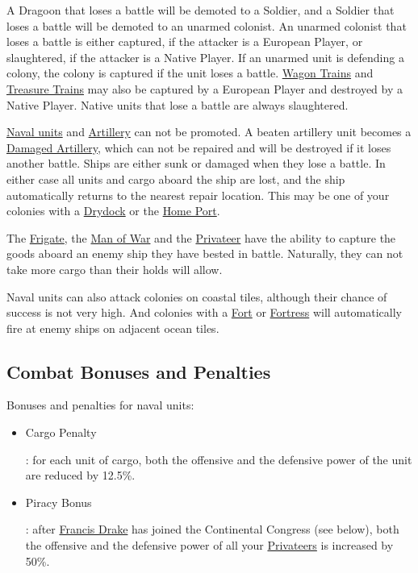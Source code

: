 \documentclass[12pt]{book}
\begin{document}
A Dragoon that loses a battle will be demoted to a Soldier, and a
Soldier that loses a battle will be demoted to an unarmed colonist. An
unarmed colonist that loses a battle is either captured, if the
attacker is a European Player, or slaughtered, if the attacker is a
Native Player.  If an unarmed unit is defending a colony, the colony
is captured if the unit loses a battle.  \hyperlink{Wagon Train}{Wagon
  Trains} and \hyperlink{Treasure Train}{Treasure Trains} may also be
captured by a European Player and destroyed by a Native Player. Native
units that lose a battle are always slaughtered.

\hyperlink{Naval Units}{Naval units} and
\hyperlink{Artillery}{Artillery} can not be promoted. A beaten
artillery unit becomes a \hyperlink{Damaged Artillery}{Damaged
Artillery}, which can not be repaired and will be destroyed if it
loses another battle. Ships are either sunk or damaged when they lose
a battle. In either case all units and cargo aboard the ship are lost,
and the ship automatically returns to the nearest repair
location. This may be one of your colonies with a
\hyperlink{Drydock}{Drydock} or the \hyperlink{Home Port}{Home Port}.

The \hyperlink{Frigate}{Frigate}, the \hyperlink{Man of War}{Man of
War} and the \hyperlink{Privateer}{Privateer} have the ability to
capture the goods aboard an enemy ship they have bested in
battle. Naturally, they can not take more cargo than their holds will
allow.

Naval units can also attack colonies on coastal tiles, although their
chance of success is not very high. And colonies with a
\hyperlink{Fort}{Fort} or \hyperlink{Fortress}{Fortress} will
automatically fire at enemy ships on adjacent ocean tiles.


\hypertarget{combat bonuses}{\subsection{Combat Bonuses and Penalties}}

Bonuses and penalties for naval units:

\begin{itemize}
\item \hypertarget{Cargo Penalty}{Cargo Penalty}: for each unit of
  cargo, both the offensive and the defensive power of the unit are
  reduced by 12.5\%.
\item \hypertarget{Piracy Bonus}{Piracy Bonus}: after
  \hyperlink{Francis Drake}{Francis Drake} has joined the Continental
  Congress (see below), both the offensive and the defensive power of
  all your \hyperlink{Privateer}{Privateers} is increased by 50\%.
\end{itemize}
\end{document}
